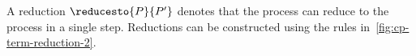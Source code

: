\begin{definition}\label{def:cp-term-reduction-2}
  A reduction $\reducesto{P}{P'}$ denotes that the process  can reduce to
  the process  in a single step. Reductions can be constructed using the
  rules in~\cref{fig:cp-term-reduction-2}.
\end{definition}
